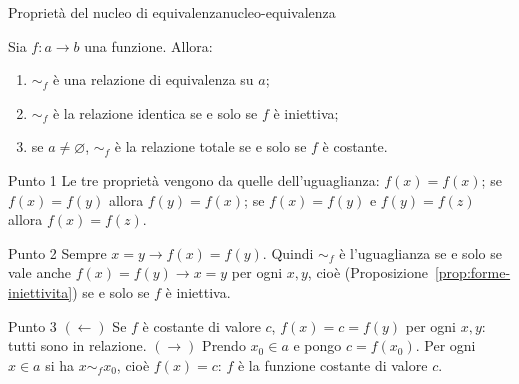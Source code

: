 
\begin{concetto}
\begin{Proposizione}{Proprietà del nucleo di equivalenza}{nucleo-equivalenza}
    \begin{prerequisiti}
    \end{prerequisiti}
    Sia $f \colon a \to b$ una funzione. Allora:
    \begin{enumerate}
        \item $\sim_f$ è una relazione di equivalenza su $a$;
        \item $\sim_f$ è la relazione identica se e solo se $f$ è iniettiva;
        \item se $a \neq \varnothing$, $\sim_f$ è la relazione totale se e solo se $f$ è costante.
    \end{enumerate}
\end{Proposizione}
\begin{dimostrazione}
    \begin{caso}{Punto 1}
        Le tre proprietà vengono da quelle dell'uguaglianza: $f(x) = f(x)$; se $f(x) = f(y)$ allora $f(y) = f(x)$; se
        $f(x) = f(y)$ e $f(y) = f(z)$ allora $f(x) = f(z)$.
    \end{caso}
    \begin{caso}{Punto 2}
        Sempre $x = y \rightarrow f(x) = f(y)$. Quindi $\sim_f$ è l'uguaglianza se e solo se vale anche
        $f(x) = f(y) \rightarrow x = y$ per ogni $x, y$, cioè (Proposizione~\ref{prop:forme-iniettivita}) se e solo se $f$ è iniettiva.
    \end{caso}
    \begin{caso}{Punto 3}
        $(\leftarrow)$ Se $f$ è costante di valore $c$, $f(x) = c = f(y)$ per ogni $x, y$: tutti sono in relazione.
        $(\rightarrow)$ Prendo $x_0 \in a$ e pongo $c = f(x_0)$. Per ogni $x \in a$ si ha $x \sim_f x_0$, cioè $f(x) = c$: $f$ è la
        funzione costante di valore $c$.
    \end{caso}
\end{dimostrazione}
\end{concetto}

